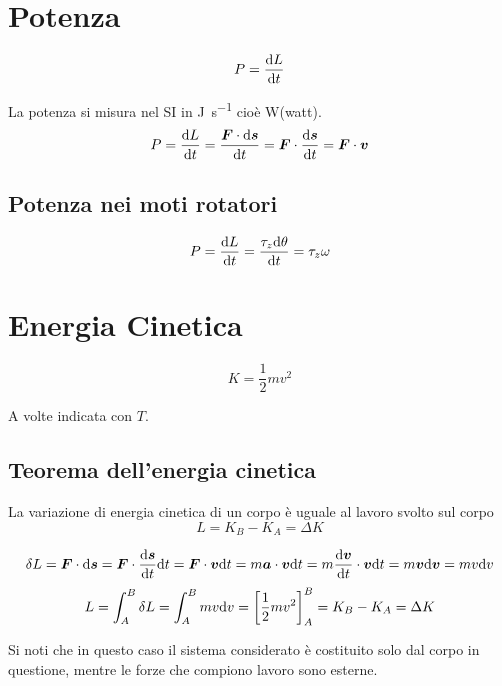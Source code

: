 \section{Potenza}
\begin{Def}[potenza]
  \begin{equation}
    P=\frac{\mathrm{d} L}{\mathrm{d} t}
  \end{equation}
\end{Def}
La potenza si misura nel SI in \si{\joule\per\second} cioè \si{\watt}(watt).
\begin{equation}
  P=\frac{\mathrm{d} L}{\mathrm{d} t}=\frac{\boldsymbol{F}\cdot\mathrm{d} \boldsymbol{s}}{\mathrm{d} t}=\boldsymbol{F}\cdot\frac{\mathrm{d} \boldsymbol{s}}{\mathrm{d}
    t}=\boldsymbol{F}\cdot \boldsymbol{v}
\end{equation}

\subsection{Potenza nei moti rotatori}
\begin{equation}
  P=\frac{\mathrm{d} L}{\mathrm{d} t}=\frac{\tau_z\mathrm{d}\theta}{\mathrm{d}
    t}=\tau_z\omega
\end{equation}

\section[Energia Cinetica]{Energia Cinetica}
\begin{Def}
  \[K=\frac{1}{2}mv^2\]
\end{Def}
A volte indicata con $T$.
\subsection{Teorema dell'energia cinetica}
\begin{Teo}
  La variazione di energia cinetica di un corpo è uguale al lavoro svolto sul corpo
  \begin{equation}
    L=K_B-K_A=\Delta K
  \end{equation}

\end{Teo}
\[\delta L=\boldsymbol{F}\cdot\mathrm{d} \boldsymbol{s}=\boldsymbol{F}\cdot\frac{\mathrm{d} \boldsymbol{s}}{\mathrm{d} t}\mathrm{d} t=\boldsymbol{F}\cdot\boldsymbol{v}\mathrm{d} t=m\boldsymbol{a}\cdot\boldsymbol{v}\mathrm{d} t=m\frac{\mathrm{d} \boldsymbol{v}}{\mathrm{d} t}\cdot\boldsymbol{v}\mathrm{d} t=m\boldsymbol{v}\mathrm{d} \boldsymbol{v}=mv\mathrm{d} v\]
\[L = \int_A^B \delta L = \int_A^B mv\mathrm{d} v = \left[\frac{1}{2}m v^2\right]_A^B = K_B - K_A = \Delta K\]

Si noti che in questo caso il sistema considerato è costituito solo dal corpo in questione, mentre le forze che compiono lavoro sono esterne.

